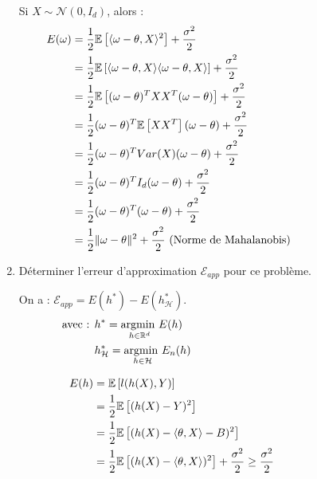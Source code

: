 \documentclass[12pt,a4paper]{article}
\begin{document}
\begin{enumerate}
    \color{blue}
    Si $X \sim \mathcal{N}(0, I_d)$, alors :
    \begin{align*}
        E(\omega) &= \frac{1}{2} \mathbb{E} \left[\langle \omega - \theta, X \rangle ^2 \right] + \frac{\sigma^2 }{2} \hspace{14.5cm} \\
        &= \frac{1}{2} \mathbb{E} \left[\langle \omega - \theta, X \rangle \langle \omega - \theta, X \rangle \right] + \frac{\sigma^2 }{2} \\
        &= \frac{1}{2} \mathbb{E} \left[(\omega - \theta)^T X X^T (\omega - \theta) \right] + \frac{\sigma^2 }{2} \\
        &= \frac{1}{2} (\omega - \theta)^T \mathbb{E} \left[X X^T \right] (\omega - \theta) + \frac{\sigma^2 }{2} \\
        &= \frac{1}{2} (\omega - \theta)^T Var(X) (\omega - \theta) + \frac{\sigma^2 }{2} \\
        &= \frac{1}{2} (\omega - \theta)^T I_d (\omega - \theta) + \frac{\sigma^2 }{2} \\
        &= \frac{1}{2} (\omega - \theta)^T (\omega - \theta) + \frac{\sigma^2 }{2} \\
        &= \frac{1}{2} \|\omega - \theta\|^2 + \frac{\sigma^2 }{2} \text{ (Norme de Mahalanobis)}\\
    \end{align*}

    \color{black}
    \item Déterminer l’erreur d’approximation $\mathcal{E}_{app}$ pour ce problème.
    
    \color{blue}
    On a : $\mathcal{E}_{app} = E(h^*) - E(h^*_\mathcal{H})$.
    \begin{align*}
        \text{avec : } &h^* = \underset{h \in \mathbb{R}^d}{\text{argmin }} E(h) \hspace{14.5cm}\\
        &h^*_\mathcal{H} = \underset{h \in \mathcal{H}}{\text{argmin }} E_n(h)
    \end{align*}

    \begin{align*}
        E(h) &= \mathbb{E} \left[l(h(X), Y)\right] \hspace{14.5cm}\\
        &= \frac{1}{2} \mathbb{E} \left[(h(X) - Y)^2\right] \\
        &= \frac{1}{2} \mathbb{E} \left[(h(X) - \langle \theta, X \rangle - B)^2\right] \\
        &= \frac{1}{2} \mathbb{E} \left[(h(X) - \langle \theta, X \rangle)^2\right] + \frac{\sigma^2 }{2} \geq \frac{\sigma^2 }{2}
    \end{align*}


\end{enumerate}
\end{document}
